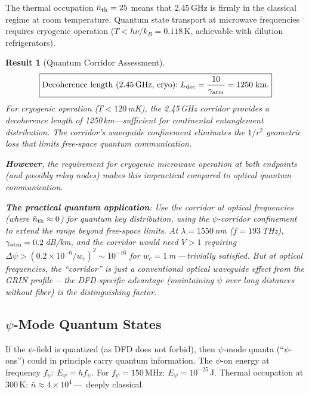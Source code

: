 \documentclass[aps,prd,twocolumn,superscriptaddress]{revtex4-2}
\newtheorem{result}{Result}
\begin{document}
The thermal occupation $\bar{n}_{\rm th} = 25$ means that 2.45\,GHz
is firmly in the classical regime at room temperature. Quantum
state transport at microwave frequencies requires cryogenic
operation ($T < h\nu/k_B = 0.118$\,K, achievable with dilution
refrigerators).

\begin{result}[Quantum Corridor Assessment]
\begin{equation}
\boxed{
\text{Decoherence length (2.45\,GHz, cryo):}\;
L_{\rm dec} = \frac{10}{\gamma_{\rm atm}} = 1250\;\text{km.}
}
\label{eq:decoherence-length}
\end{equation}
For cryogenic operation ($T < 120$\,mK), the 2.45\,GHz corridor
provides a decoherence length of 1250\,km---sufficient for continental
entanglement distribution. The corridor's waveguide confinement
eliminates the $1/r^2$ geometric loss that limits free-space
quantum communication.

\textbf{However}, the requirement for cryogenic microwave operation
at both endpoints (and possibly relay nodes) makes this impractical
compared to optical quantum communication.

\textbf{The practical quantum application}: Use the corridor at
optical frequencies (where $\bar{n}_{\rm th} \approx 0$) for quantum
key distribution, using the $\psi$-corridor confinement to extend
the range beyond free-space limits. At $\lambda = 1550$\,nm
($f = 193$\,THz), $\gamma_{\rm atm} = 0.2$\,dB/km, and the corridor
would need $V > 1$ requiring $\Delta\psi > (0.2\times10^{-6}/w_c)^2
\sim 10^{-16}$ for $w_c = 1$\,m\,---\,trivially satisfied.  But
at optical frequencies, the ``corridor'' is just a conventional
optical waveguide effect from the GRIN profile\,---\,the DFD-specific
advantage (maintaining $\psi$ over long distances without fiber) is
the distinguishing factor.
\end{result}

\subsection{$\psi$-Mode Quantum States}

If the $\psi$-field is quantized (as DFD does not forbid), then
$\psi$-mode quanta (``$\psi$-ons'') could in principle carry
quantum information. The $\psi$-on energy at frequency $f_\psi$:
$E_\psi = hf_\psi$. For $f_\psi = 150$\,MHz: $E_\psi = 10^{-25}$\,J.
Thermal occupation at 300\,K: $\bar{n} \approx 4\times10^4$\,---\,
deeply classical.
\end{document}
